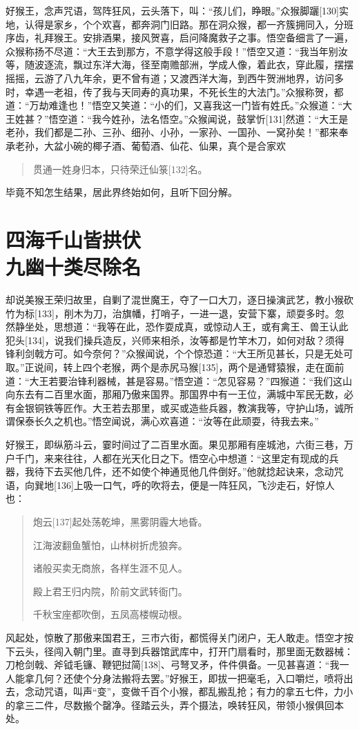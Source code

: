 \documentclass[12pt,UTF8]{ctexbook}
\begin{document}
好猴王，念声咒语，驾阵狂风，云头落下，叫：“孩儿们，睁眼。”众猴脚躧[130]实地，认得是家乡，个个欢喜，都奔洞门旧路。那在洞众猴，都一齐簇拥同入，分班序齿，礼拜猴王。安排酒果，接风贺喜，启问降魔救子之事。悟空备细言了一遍，众猴称扬不尽道：“大王去到那方，不意学得这般手段！”悟空又道：“我当年别汝等，随波逐流，飘过东洋大海，径至南赡部洲，学成人像，着此衣，穿此履，摆摆摇摇，云游了八九年余，更不曾有道；又渡西洋大海，到西牛贺洲地界，访问多时，幸遇一老祖，传了我与天同寿的真功果，不死长生的大法门。”众猴称贺，都道：“万劫难逢也！”悟空又笑道：“小的们，又喜我这一门皆有姓氏。”众猴道：“大王姓甚？”悟空道：“我今姓孙，法名悟空。”众猴闻说，鼓掌忻[131]然道：“大王是老孙，我们都是二孙、三孙、细孙、小孙，一家孙、一国孙、一窝孙矣！”都来奉承老孙，大盆小碗的椰子酒、葡萄酒、仙花、仙果，真个是合家欢

\begin{quotation}
贯通一姓身归本，只待荣迁仙箓[132]名。
\end{quotation}
毕竟不知怎生结果，居此界终始如何，且听下回分解。

\chapter[四海千山皆拱伏\ 九幽十类尽除名]{四海千山皆拱伏\\九幽十类尽除名}

却说美猴王荣归故里，自剿了混世魔王，夺了一口大刀，逐日操演武艺，教小猴砍竹为标[133]，削木为刀，治旗幡，打哨子，一进一退，安营下寨，顽耍多时。忽然静坐处，思想道：“我等在此，恐作耍成真，或惊动人王，或有禽王、兽王认此犯头[134]，说我们操兵造反，兴师来相杀，汝等都是竹竿木刀，如何对敌？须得锋利剑戟方可。如今奈何？”众猴闻说，个个惊恐道：“大王所见甚长，只是无处可取。”正说间，转上四个老猴，两个是赤尻马猴[135]，两个是通臂猿猴，走在面前道：“大王若要治锋利器械，甚是容易。”悟空道：“怎见容易？”四猴道：“我们这山向东去有二百里水面，那厢乃傲来国界。那国界中有一王位，满城中军民无数，必有金银铜铁等匠作。大王若去那里，或买或造些兵器，教演我等，守护山场，诚所谓保泰长久之机也。”悟空闻说，满心欢喜道：“汝等在此顽耍，待我去来。”

好猴王，即纵筋斗云，霎时间过了二百里水面。果见那厢有座城池，六街三巷，万户千门，来来往往，人都在光天化日之下。悟空心中想道：“这里定有现成的兵器，我待下去买他几件，还不如使个神通觅他几件倒好。”他就捻起诀来，念动咒语，向巽地[136]上吸一口气，呼的吹将去，便是一阵狂风，飞沙走石，好惊人也：
\begin{quotation}
炮云[137]起处荡乾坤，黑雾阴霾大地昏。

江海波翻鱼蟹怕，山林树折虎狼奔。

诸般买卖无商旅，各样生涯不见人。

殿上君王归内院，阶前文武转衙门。

千秋宝座都吹倒，五凤高楼幌动根。
\end{quotation}
风起处，惊散了那傲来国君王，三市六街，都慌得关门闭户，无人敢走。悟空才按下云头，径闯入朝门里。直寻到兵器馆武库中，打开门扇看时，那里面无数器械：刀枪剑戟、斧钺毛镰、鞭钯挝简[138]、弓弩叉矛，件件俱备。一见甚喜道：“我一人能拿几何？还使个分身法搬将去罢。”好猴王，即拔一把毫毛，入口嚼烂，喷将出去，念动咒语，叫声“变”，变做千百个小猴，都乱搬乱抢；有力的拿五七件，力小的拿三二件，尽数搬个罄净。径踏云头，弄个摄法，唤转狂风，带领小猴俱回本处。
\end{document}

